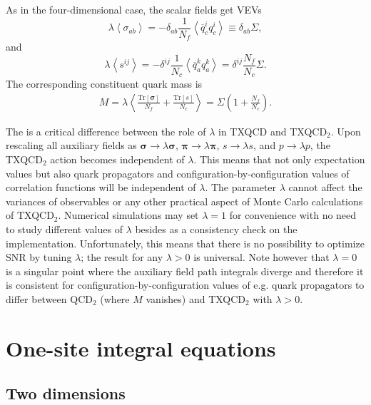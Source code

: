 \documentclass[%
    twocolumn,
superscriptaddress,
preprintnumbers,
nofootinbib,
 amsmath,amssymb,
 aps,
 prd,
 floatfix,
]{revtex4-2}
\begin{document}
As in the four-dimensional case, the scalar fields get VEVs
\begin{equation}
    \lambda \left< \sigma_{ab} \right> = -\delta_{ab} \frac{1}{N_f} \left< \overline{q}^i_c q^i_c \right> \equiv \delta_{ab} \Sigma,
\end{equation}
and
\begin{equation}
    \lambda \left< s^{ij} \right> = -\delta^{ij} \frac{1}{N_c} \left< \overline{q}^k_a q^k_a \right> = \delta^{ij} \frac{N_f}{N_c} \Sigma.
\end{equation}
The corresponding constituent quark mass is
\begin{equation}\label{eq:M_Sigma_2}
\begin{split}
    M =  \lambda \left< \frac{\text{Tr}[\bm{\sigma}]}{N_f}   + \frac{\text{Tr}[s]}{N_c}  \right>  = \Sigma \left( 1 + \frac{N_f}{N_c} \right).
    \end{split}
\end{equation}

The is a critical difference between the role of $\lambda$ in TXQCD and TXQCD$_2$.
Upon rescaling all auxiliary fields as $\bm{\sigma} \rightarrow \lambda \bm{\sigma}$, $\bm{\pi} \rightarrow \lambda \bm{\pi}$, $s \rightarrow \lambda s$, and $p\rightarrow \lambda p$, the TXQCD$_2$ action becomes independent of $\lambda$.
This means that not only expectation values but also quark propagators and configuration-by-configuration values of correlation functions will be independent of $\lambda$.
The parameter $\lambda$ cannot affect the variances of observables or any other practical aspect of Monte Carlo calculations of TXQCD$_2$.
Numerical simulations may set $\lambda = 1$ for convenience with no need to study different values of $\lambda$ besides as a consistency check on the implementation.
Unfortunately, this means that there is no possibility to optimize SNR by tuning $\lambda$; the result for any $\lambda > 0$ is universal.
Note however that $\lambda = 0$ is a singular point where the auxiliary field path integrals diverge and therefore it is consistent for configuration-by-configuration values of e.g. quark propagators to differ between QCD$_2$ (where $M$ vanishes) and TXQCD$_2$ with $\lambda > 0$.

\section{One-site integral equations}

\subsection{Two dimensions}
\end{document}
